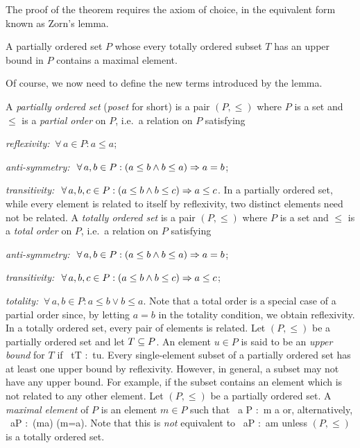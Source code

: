 The proof of the theorem requires the axiom of choice, in the equivalent form known as Zorn's lemma.

\bl[Zorn]
A partially ordered set $P$ whose every totally ordered subset $T$ has an upper bound in $P$ contains a maximal element.
\el

Of course, we now need to define the new terms introduced by the lemma. 

\bd
A \emph{partially ordered set} (\emph{poset} for short) is a pair $(P,\leq)$ where $P$ is a set and~$\leq$ is a \emph{partial order} on $P$, i.e.\ a relation on $P$ satisfying
\ben[label=\roman*)]
\item \emph{reflexivity:} $\ \forall \, a \in P: a\leq a$;
\item \emph{anti-symmetry:} $\ \forall \, a,b\in P : ( a\leq b \land b\leq a) \Rightarrow a=b$;
\item \emph{transitivity:} $\ \forall \, a,b,c\in P:(a\leq b \land b\leq c)\Rightarrow a\leq c$.
\een
\ed
In a partially ordered set, while every element is related to itself by reflexivity, two distinct elements need not be related.
\bd
A \emph{totally ordered set} is a pair $(P,\leq)$ where $P$ is a set and $\leq$ is a \emph{total order} on $P$, i.e.\ a relation on $P$ satisfying
\ben[label=\alph*)]
\item \emph{anti-symmetry:} $\ \forall \, a,b\in P : ( a\leq b \land b\leq a) \Rightarrow a=b$;
\item \emph{transitivity:} $\ \forall \, a,b,c\in P:(a\leq b \land b\leq c)\Rightarrow a\leq c$;
\item \emph{totality:} $\ \forall \, a,b \in P: a\leq b\lor b\leq a$.
\een
\ed
Note that a total order is a special case of a partial order since, by letting $a=b$ in the totality condition, we obtain reflexivity. In a totally ordered set, every pair of elements is related. 
\bd
Let $(P,\leq)$ be a partially ordered set and let $T\subseteq P$. An element $u\in P$ is said to be an \emph{upper bound} for $T$ if
\bse
\forall \, t\in T :\ t\leq u.
\ese
\ed
Every single-element subset of a partially ordered set has at least one upper bound by reflexivity. However, in general, a subset may not have any upper bound. For example, if the subset contains an element which is not related to any other element.
\bd
Let $(P,\leq)$ be a partially ordered set. A \emph{maximal element} of $P$ is an element $m\in P$ such that
\bse
\nexists \, a \in P :\ m \leq a
\ese
or, alternatively,
\bse
\forall \, a\in P :\ (m\leq a) \imp (m=a).
\ese
Note that this is \emph{not} equivalent to 
\bse
\forall \, a\in P :\ a\leq m
\ese
unless $(P,\leq)$ is a totally ordered set.
\ed

